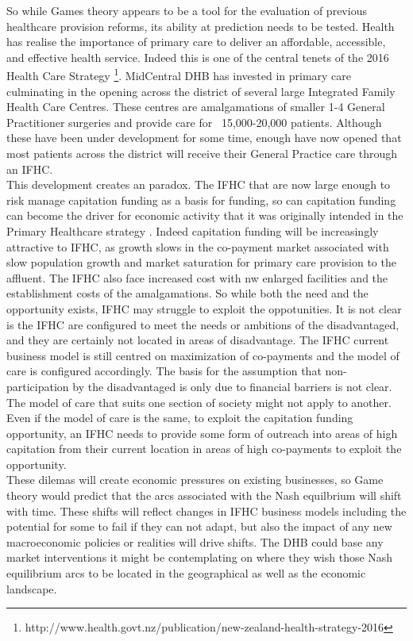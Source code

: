 \documentclass[11pt,a4paper]{article}
\begin{document}
So while Games theory appears to be a tool for the evaluation of previous healthcare provision reforms, its ability at prediction needs to be tested. Health has realise the importance of primary care to deliver an affordable, accessible, and effective health service. Indeed this is one of the central tenets of the 2016 Health Care Strategy \footnote{http://www.health.govt.nz/publication/new-zealand-health-strategy-2016}. MidCentral DHB has invested in primary care culminating in the opening across the district of several large Integrated Family Health Care Centres. These centres are amalgamations of smaller 1-4 General Practitioner surgeries and provide care for ~15,000-20,000 patients. Although these have been under development for some time, enough have now opened that most patients across the district will receive their General Practice care through an IFHC.\\

This development creates an paradox. The IFHC that are now large enough to risk manage capitation funding as a basis for funding, so can capitation funding can become the driver for economic activity that it was originally intended in the Primary Healthcare strategy \citep{king2001primary}. Indeed capitation funding will be increasingly attractive to IFHC, as growth slows in the co-payment market associated with slow population growth and market saturation for primary care provision to the affluent. The IFHC also face increased cost with nw enlarged facilities and the establishment costs of the amalgamations. So while both the need and the opportunity exists, IFHC may struggle to exploit the oppotunities. It is not clear is the IFHC are configured to meet the needs or ambitions of the disadvantaged, and they are certainly not located in areas of disadvantage. The IFHC current business model is still centred on maximization of co-payments and the model of care is configured accordingly. The basis for the assumption that non-participation by the disadvantaged is only due to financial barriers is not clear. The model of care that suits one section of society might not apply to another. Even if the model of care is the same, to exploit the capitation funding opportunity, an IFHC needs to provide some form of outreach into areas of high capitation from their current location in areas of high co-payments to exploit the opportunity.\\

These dilemas will create economic pressures on existing businesses, so Game theory would predict that the arcs associated with the Nash equilbrium will shift with time. These shifts will reflect changes in IFHC business models including the potential for some to fail if they can not adapt, but also the impact of any new macroeconomic policies or realities will drive shifts. The DHB could base any market interventions it might be contemplating on where they wish those Nash equilibrium arcs to be located in the geographical as well as the economic landscape.\\
\end{document}
